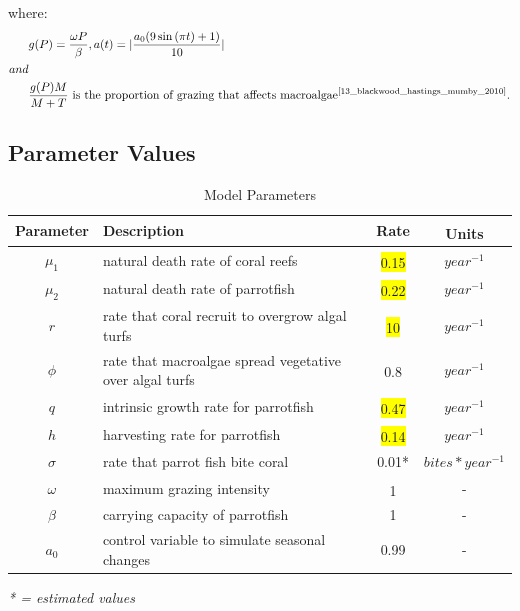 \documentclass[12pt]{article}
\begin{document}
where: 
\begin{align*}
&g(P) = \frac{\omega P}{\beta}, a(t)=|\frac{a_{0}(9\sin{(\pi t) }+1)}{10}|\\
and\\
&\frac{g(P)M}{M + T} \text{ is the proportion of grazing that affects macroalgae} \textsuperscript{\cite{13_blackwood_hastings_mumby_2010}}.
\end{align*}


\subsection{Parameter Values}
\begin{table}[H]
    \centering
    \begin{tabular}{c p{9cm} c c}
        \hline
        Parameter & Description & Rate & Units\textsuperscript{\cite{12_noaa_report}\cite{04_mathanalysis}\cite{13_blackwood_hastings_mumby_2010}}\\
        \hline
        \hline
        $\mu_{1}$ & natural death rate of coral reefs & \colorbox{yellow}{0.15}\textsuperscript{\cite{16_wolanski_richmond_mccook_2004}} & $year^{-1}$\\ %
        $\mu_{2}$ & natural death rate of parrotfish & \colorbox{yellow}{0.22}\textsuperscript{\cite{12_noaa_report}} & $year^{-1}$\\ %
        $r$ & rate that coral recruit to overgrow algal turfs & \colorbox{yellow}{10}\textsuperscript{\cite{16_wolanski_richmond_mccook_2004}} & $year^{-1}$\\ %
        $\phi$ & rate that macroalgae spread vegetative over algal turfs & 0.8\textsuperscript{\cite{04_mathanalysis}} & $year^{-1}$\\ %
        $q$ & intrinsic growth rate for parrotfish & \colorbox{yellow}{0.47}\textsuperscript{\cite{12_noaa_report}} & $year^{-1}$\\ %
        $h$ & harvesting rate for parrotfish & \colorbox{yellow}{0.14}\textsuperscript{\cite{12_noaa_report}} & $year^{-1}$\\ %
        $\sigma$ & rate that parrot fish bite coral & 0.01*& $bites*year^{-1}$\\
        $\omega$ & maximum grazing intensity & 1\textsuperscript{\cite{13_blackwood_hastings_mumby_2010}} & -\\
        $\beta$ & carrying capacity of parrotfish & 1 & -\\
        $a_{0}$ & control variable to simulate seasonal changes & 0.99 & - \\%
        \hline
    \end{tabular}
    \caption{Model Parameters}
    \label{tab:parameters}
\end{table}
\textit{* = estimated values}
\end{document}
